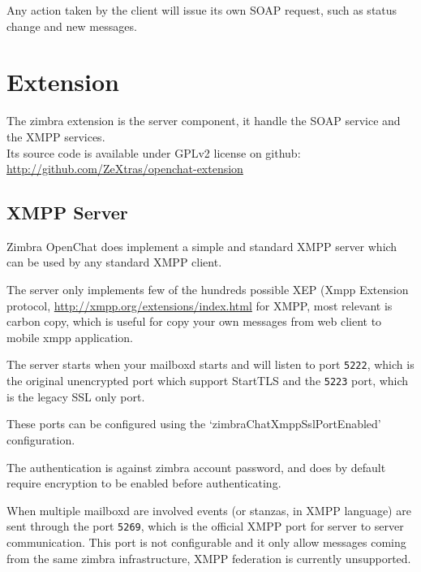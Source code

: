 Any action taken by the client will issue its own SOAP request, such as status change and new messages.

\section{Extension}
The zimbra extension is the server component, it handle the SOAP service and the XMPP services.\\
Its source code is available under GPLv2 license on github: \url{http://github.com/ZeXtras/openchat-extension}

\subsection{XMPP Server}
Zimbra OpenChat does implement a simple and standard XMPP server which can be used by any standard XMPP client.

The server only implements few of the hundreds possible XEP (Xmpp Extension protocol, \url{http://xmpp.org/extensions/index.html} for XMPP,
 most relevant is carbon copy, which is useful for copy your own messages from web client to mobile xmpp application.

The server starts when your mailboxd starts and will listen to port \verb+5222+, which is the original unencrypted port
 which support StartTLS and the \verb+5223+ port, which is the legacy SSL only port.

These ports can be configured using the `zimbraChatXmppSslPortEnabled' configuration.

The authentication is against zimbra account password, and does by default require encryption to be enabled before authenticating.

When multiple mailboxd are involved events (or stanzas, in XMPP language) are sent through the port \verb+5269+,
 which is the official XMPP port for server to server communication.
 This port is not configurable and it only allow messages coming from the same zimbra infrastructure, XMPP federation is currently unsupported.
